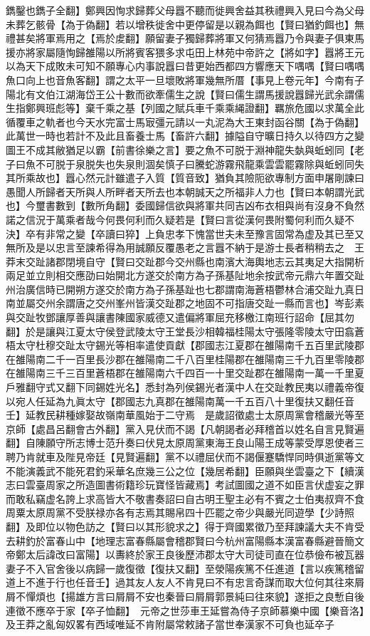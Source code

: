 鐫鑿也鐫子全翻】鄭興因恂求歸葬父母囂不聽而徙興舍益其秩禮興入見曰今為父母未葬乞骸骨【為于偽翻】若以增秩徙舍中更停留是以親為餌也【賢曰猶釣餌也】無禮甚矣將軍焉用之【焉於䖍翻】願留妻子獨歸葬將軍又何猜焉囂乃令與妻子俱東馬援亦將家屬隨恂歸雒陽以所將賓客猥多求屯田上林苑中帝許之【將如字】囂將王元以為天下成敗未可知不願專心内事說囂曰昔更始西都四方響應天下喁喁【賢曰喁喁魚口向上也音魚客翻】謂之太平一旦壞敗將軍幾無所厝【事見上卷元年】今南有子陽北有文伯江湖海岱王公十數而欲牽儒生之說【賢曰儒生謂馬援說囂歸光武余謂儒生指鄭興班彪等】棄千乘之基【列國之賦兵車千乘乘䋲證翻】羈旅危國以求萬全此循覆車之軌者也今天水完富士馬㝡彊元請以一丸泥為大王東封函谷關【為于偽翻】此萬世一時也若計不及此且畜養士馬【畜許六翻】據隘自守曠日持久以待四方之變圖王不成其敝猶足以霸【前書徐樂之言】要之魚不可脱于淵神龍失埶與蚯蚓同【老子曰魚不可脱于泉脱失也失泉則涸矣慎子曰騰蛇游霧飛龍乘雲雲罷霧除與蚯蚓同失其所乘故也】囂心然元計雖遣子入質【質音致】猶負其險阨欲專制方面申屠剛諫曰愚聞人所歸者天所與人所畔者天所去也本朝誠天之所福非人力也【賢曰本朝謂光武也】今璽書數到【數所角翻】委國歸信欲與將軍共同吉凶布衣相與尚有沒身不負然諾之信況于萬乘者哉今何畏何利而久疑若是【賢曰言從漢何畏附蜀何利而久疑不決】卒有非常之變【卒讀曰猝】上負忠孝下愧當世夫未至豫言固常為虚及其已至又無所及是以忠言至諫希得為用誠願反覆愚老之言囂不納于是游士長者稍稍去之　王莽末交趾諸郡閉境自守【賢曰交趾郡今交州縣也南濱大海輿地志云其夷足大指開析兩足並立則相交應劭曰始開北方遂交於南方為子孫基阯地余按武帝元鼎六年置交趾州治廣信時已開朔方遂交於南方為子孫基趾也七郡謂南海蒼梧鬱林合浦交趾九真日南並屬交州余謂唐之交州峯州皆漢交趾郡之地固不可指唐交趾一縣而言也】岑彭素與交趾牧鄧讓厚善與讓書陳國家威德又遣偏將軍屈充移檄江南班行詔命【屈其勿翻】於是讓與江夏太守侯登武陵太守王堂長沙相韓福桂陽太守張隆零陵太守田翕蒼梧太守杜穆交趾太守錫光等相率遣使貢獻【郡國志江夏郡在雒陽南千五百里武陵郡在雒陽南二千一百里長沙郡在雒陽南二千八百里桂陽郡在雒陽南三千九百里零陵郡在雒陽南三千三百里蒼梧郡在雒陽南六千四百一十里交趾郡在雒陽南一萬一千里夏戶雅翻守式又翻下同錫姓光名】悉封為列侯錫光者漢中人在交趾教民夷以禮義帝復以宛人任延為九眞太守【郡國志九真郡在雒陽南萬一千五百八十里復扶又翻任音壬】延教民耕種嫁娶故嶺南華風始于二守焉　是歲詔徵處士太原周黨會稽嚴光等至京師【處昌呂翻會古外翻】黨入見伏而不謁【凡朝謁者必拜稽首以姓名自言見賢遍翻】自陳願守所志博士范升奏曰伏見太原周黨東海王良山陽王成等蒙受厚恩使者三聘乃肯就車及陛見帝廷【見賢遍翻】黨不以禮屈伏而不謁偃蹇驕悍同時俱逝黨等文不能演義武不能死君釣采華名庶幾三公之位【幾居希翻】臣願與坐雲臺之下【續漢志曰雲臺周家之所造圖書術籍珍玩寶怪皆藏焉】考試圖國之道不如臣言伏虚妄之罪而敢私竊虚名誇上求高皆大不敬書奏詔曰自古明王聖主必有不賓之士伯夷叔齊不食周粟太原周黨不受朕禄亦各有志焉其賜帛四十匹罷之帝少與嚴光同遊學【少詩照翻】及即位以物色訪之【賢曰以其形貌求之】得于齊國累徵乃至拜諫議大夫不肯受去耕釣於富春山中【地理志富春縣屬會稽郡賢曰今杭州富陽縣本漢富春縣避晉簡文帝鄭太后諱改曰富陽】以夀終於家王良後歷沛郡太守大司徒司直在位恭儉布被瓦器妻子不入官舍後以病歸一歲復徵【復扶又翻】至滎陽疾篤不任進道【言以疾篤稽留道上不進于行也任音壬】過其友人友人不肯見曰不有忠言奇謀而取大位何其往來屑屑不憚煩也【揚雄方言曰屑屑不安也秦晉曰屑屑郭景純曰往來貌】遂拒之良慙自後連徵不應卒于家【卒子恤翻】　元帝之世莎車王延嘗為侍子京師慕樂中國【樂音洛】及王莽之亂匈奴畧有西域唯延不肯附屬常敕諸子當世奉漢家不可負也延卒子